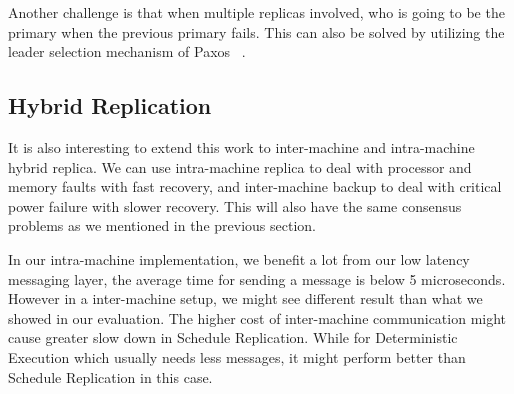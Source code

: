 Another challenge is that when multiple replicas involved, who is going to be the primary when the previous primary fails. This can also be solved by utilizing the leader selection mechanism of Paxos ~\cite{lamport2001paxos}.

\subsection{Hybrid Replication}

It is also interesting to extend this work to inter-machine and intra-machine hybrid replica. We can use intra-machine replica to deal with processor and memory faults with fast recovery, and inter-machine backup to deal with critical power failure with slower recovery. This will also have the same consensus problems as we mentioned in the previous section.

In our intra-machine implementation, we benefit a lot from our low latency messaging layer, the average time for sending a message is below 5 microseconds. However in a inter-machine setup, we might see different result than what we showed in our evaluation. The higher cost of inter-machine communication might cause greater slow down in Schedule Replication. While for Deterministic Execution which usually needs less messages, it might perform better than Schedule Replication in this case.